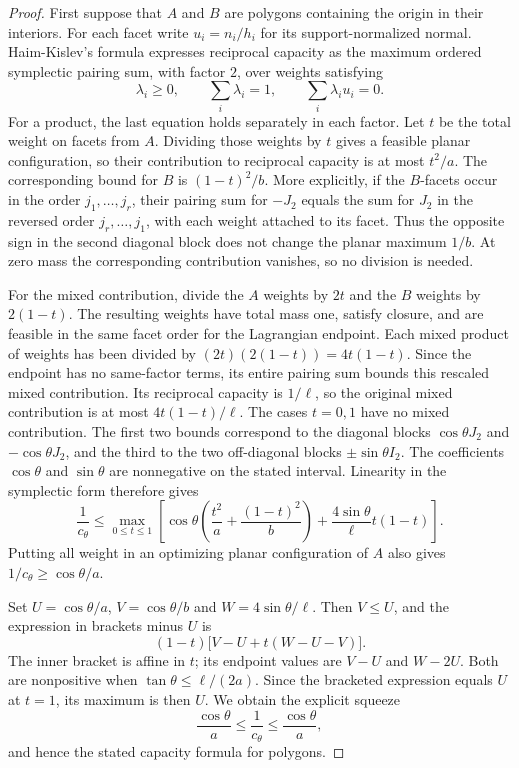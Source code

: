 \begin{proof}
First suppose that $A$ and $B$ are polygons containing the origin in their
interiors. For each facet write $u_i=n_i/h_i$ for its support-normalized
normal. Haim-Kislev's formula \cite[Theorem~1.1]{HK2017} expresses reciprocal
capacity as the maximum ordered symplectic pairing sum, with factor $2$,
over weights satisfying
\[
 \lambda_i\ge0,\qquad \sum_i\lambda_i=1,
 \qquad\sum_i\lambda_i u_i=0.
\]
For a product, the last equation holds separately in each factor. Let $t$
be the total weight on facets from $A$. Dividing those weights by $t$ gives
a feasible planar configuration, so their contribution to reciprocal
capacity is at most $t^2/a$. The corresponding bound for $B$ is
$(1-t)^2/b$. More explicitly, if the $B$-facets occur in the order
$j_1,\ldots,j_r$, their pairing sum for $-J_2$ equals the sum for $J_2$
in the reversed order $j_r,\ldots,j_1$, with each weight attached to its
facet. Thus the opposite sign in the second diagonal block does not change
the planar maximum $1/b$. At zero mass the corresponding contribution
vanishes, so no division is needed.

For the mixed contribution, divide the $A$ weights by $2t$ and the $B$
weights by $2(1-t)$. The resulting weights have total mass one, satisfy
closure, and are feasible in the same facet order for the Lagrangian
endpoint. Each mixed product of weights has been divided by
$(2t)(2(1-t))=4t(1-t)$. Since the endpoint has no same-factor terms, its
entire pairing sum bounds this rescaled mixed contribution. Its reciprocal
capacity is $1/\ell$, so the original mixed contribution is at most
$4t(1-t)/\ell$. The cases $t=0,1$ have no mixed contribution.
The first two bounds correspond to the diagonal blocks
$\cos\theta J_2$ and $-\cos\theta J_2$, and the third to the two
off-diagonal blocks $\pm\sin\theta I_2$. The coefficients $\cos\theta$
and $\sin\theta$ are nonnegative on the stated interval. Linearity in
the symplectic form therefore gives
\begin{equation}\label{eq:product-mass-bound}
 \frac1{c_\theta}\le
 \max_{0\le t\le1}\left[
  \cos\theta\left(\frac{t^2}{a}+\frac{(1-t)^2}{b}\right)
  +\frac{4\sin\theta}{\ell}t(1-t)\right].
\end{equation}
Putting all weight in an optimizing planar configuration of $A$ also gives
$1/c_\theta\ge\cos\theta/a$.

Set $U=\cos\theta/a$, $V=\cos\theta/b$ and
$W=4\sin\theta/\ell$. Then $V\le U$, and the expression in brackets minus
$U$ is
\[
 (1-t)\bigl[V-U+t(W-U-V)\bigr].
\]
The inner bracket is affine in $t$; its endpoint values are $V-U$ and
$W-2U$. Both are nonpositive when
$\tan\theta\le\ell/(2a)$. Since the bracketed expression equals $U$
at $t=1$, its maximum is then $U$. We obtain the explicit squeeze
\[
 \frac{\cos\theta}{a}\le\frac1{c_\theta}
 \le\frac{\cos\theta}{a},
\]
and hence the stated capacity formula for polygons.


\end{proof}
